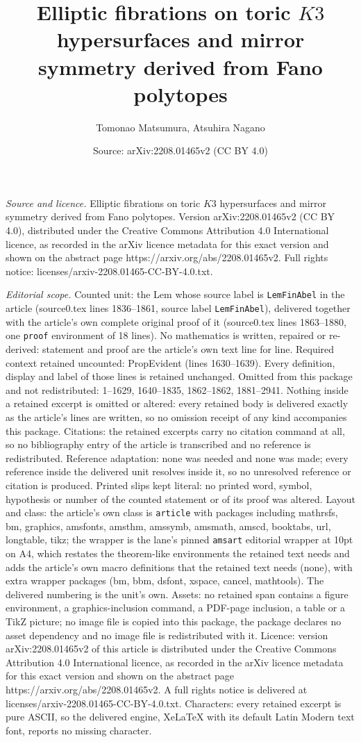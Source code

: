 \documentclass[10pt,a4paper]{amsart}
\title[Elliptic fibrations on toric $K3$ hypersurfaces and mirror s]{Elliptic fibrations on toric $K3$ hypersurfaces and mirror symmetry derived from Fano polytopes}
\author{Tomonao Matsumura, Atsuhira Nagano}
\date{Source: arXiv:2208.01465v2 (CC BY 4.0)}
\begin{document}
\maketitle

\noindent\emph{Source and licence.} Elliptic fibrations on toric $K3$ hypersurfaces and mirror symmetry derived from Fano polytopes. Version arXiv:2208.01465v2 (CC BY 4.0), distributed under the Creative Commons Attribution 4.0 International licence, as recorded in the arXiv licence metadata for this exact version and shown on the abstract page https://arxiv.org/abs/2208.01465v2. Full rights notice: licenses/arxiv-2208.01465-CC-BY-4.0.txt.\par\smallskip

\noindent\textit{Editorial scope.} Counted unit: the Lem whose source label is \texttt{LemFinAbel} in the article (source0.tex lines 1836--1861, source label \texttt{LemFinAbel}), delivered together with the article's own complete original proof of it (source0.tex lines 1863--1880, one \texttt{proof} environment of 18 lines). No mathematics is written, repaired or re-derived: statement and proof are the article's own text line for line. Required context retained uncounted: PropEvident (lines 1630--1639). Every definition, display and label of those lines is retained unchanged. Omitted from this package and not redistributed: 1--1629, 1640--1835, 1862--1862, 1881--2941. Nothing inside a retained excerpt is omitted or altered: every retained body is delivered exactly as the article's lines are written, so no omission receipt of any kind accompanies this package. Citations: the retained excerpts carry no citation command at all, so no bibliography entry of the article is transcribed and no reference is redistributed. Reference adaptation: none was needed and none was made; every reference inside the delivered unit resolves inside it, so no unresolved reference or citation is produced. Printed slips kept literal: no printed word, symbol, hypothesis or number of the counted statement or of its proof was altered. Layout and class: the article's own class is \texttt{article} with packages including mathrsfs, bm, graphics, amsfonts, amsthm, amssymb, amsmath, amscd, booktabs, url, longtable, tikz; the wrapper is the lane's pinned \texttt{amsart} editorial wrapper at 10pt on A4, which restates the theorem-like environments the retained text needs and adds the article's own macro definitions that the retained text needs (none), with extra wrapper packages (bm, bbm, dsfont, xspace, cancel, mathtools). The delivered numbering is the unit's own. Assets: no retained span contains a figure environment, a graphics-inclusion command, a PDF-page inclusion, a table or a TikZ picture; no image file is copied into this package, the package declares no asset dependency and no image file is redistributed with it. Licence: version arXiv:2208.01465v2 of this article is distributed under the Creative Commons Attribution 4.0 International licence, as recorded in the arXiv licence metadata for this exact version and shown on the abstract page https://arxiv.org/abs/2208.01465v2. A full rights notice is delivered at licenses/arxiv-2208.01465-CC-BY-4.0.txt. Characters: every retained excerpt is pure ASCII, so the delivered engine, XeLaTeX with its default Latin Modern text font, reports no missing character.
\end{document}
